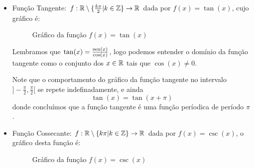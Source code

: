 \begin{itemize}
  \item Função Tangente: $f: \mathbb{R} \setminus \{\frac{k\pi}{2} | k \in \mathbb{Z}\} \rightarrow \mathbb{R}$ dada por $f(x)= \tan(x)$, cujo gráfico é:

  \begin{figure}[H]
  \centering
    \caption{Gráfico da função $f(x)= \tan (x)$}
  \end{figure}

  Lembramos que $\tan(x)= \frac{\operatorname{sen}(x)}{\cos(x)}$, logo podemos entender o domínio da função tangente como o conjunto dos $x \in \mathbb{R}$ tais que $\cos(x) \neq 0$.

  Note que o comportamento do gráfico da função tangente no intervalo $]-\frac{\pi}{2}, \frac{\pi}{2}[$ se repete indefinadamente, e ainda
  \[\tan(x)= \tan(x + \pi)\]
  donde concluímos que a função tangente é uma função períodica de período $\pi$.

  \item Função Cossecante: $f: \mathbb{R} \setminus \{ k\pi | k \in \mathbb{Z}\} \rightarrow \mathbb{R}$ dada por $f(x)= \csc(x)$, o gráfico desta função é:

  \begin{figure}[H]
  \centering
    \caption{Gráfico da função $f(x)= \csc(x)$}
  \end{figure}


\end{itemize}
